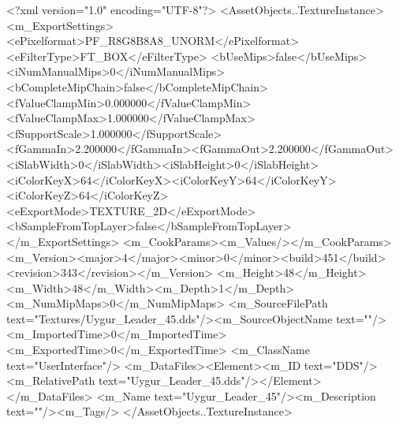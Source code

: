 <?xml version="1.0" encoding="UTF-8"?>
<AssetObjects..TextureInstance>
  <m_ExportSettings>
    <ePixelformat>PF_R8G8B8A8_UNORM</ePixelformat><eFilterType>FT_BOX</eFilterType>
    <bUseMips>false</bUseMips><iNumManualMips>0</iNumManualMips><bCompleteMipChain>false</bCompleteMipChain>
    <fValueClampMin>0.000000</fValueClampMin><fValueClampMax>1.000000</fValueClampMax><fSupportScale>1.000000</fSupportScale>
    <fGammaIn>2.200000</fGammaIn><fGammaOut>2.200000</fGammaOut><iSlabWidth>0</iSlabWidth><iSlabHeight>0</iSlabHeight>
    <iColorKeyX>64</iColorKeyX><iColorKeyY>64</iColorKeyY><iColorKeyZ>64</iColorKeyZ>
    <eExportMode>TEXTURE_2D</eExportMode><bSampleFromTopLayer>false</bSampleFromTopLayer>
  </m_ExportSettings>
  <m_CookParams><m_Values/></m_CookParams>
  <m_Version><major>4</major><minor>0</minor><build>451</build><revision>343</revision></m_Version>
  <m_Height>48</m_Height><m_Width>48</m_Width><m_Depth>1</m_Depth><m_NumMipMaps>0</m_NumMipMaps>
  <m_SourceFilePath text="Textures/Uygur_Leader_45.dds"/><m_SourceObjectName text=""/>
  <m_ImportedTime>0</m_ImportedTime><m_ExportedTime>0</m_ExportedTime>
  <m_ClassName text="UserInterface"/>
  <m_DataFiles><Element><m_ID text="DDS"/><m_RelativePath text="Uygur_Leader_45.dds"/></Element></m_DataFiles>
  <m_Name text="Uygur_Leader_45"/><m_Description text=""/><m_Tags/>
</AssetObjects..TextureInstance>
